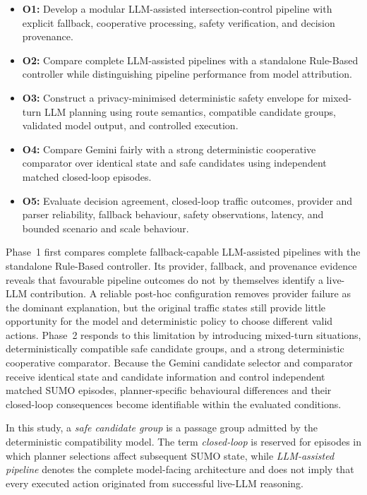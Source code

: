 \documentclass[letterpaper,10pt,conference]{ieeeconf}
\begin{document}
\begin{itemize}

    \item \textbf{O1:} Develop a modular LLM-assisted intersection-control pipeline with explicit fallback, cooperative processing, safety verification, and decision provenance.

    \item \textbf{O2:} Compare complete LLM-assisted pipelines with a standalone Rule-Based controller while distinguishing pipeline performance from model attribution.

    \item \textbf{O3:} Construct a privacy-minimised deterministic safety envelope for mixed-turn LLM planning using route semantics, compatible candidate groups, validated model output, and controlled execution.

    \item \textbf{O4:} Compare Gemini fairly with a strong deterministic cooperative comparator over identical state and safe candidates using independent matched closed-loop episodes.

    \item \textbf{O5:} Evaluate decision agreement, closed-loop traffic outcomes, provider and parser reliability, fallback behaviour, safety observations, latency, and bounded scenario and scale behaviour.

\end{itemize}



Phase~1 first compares complete fallback-capable LLM-assisted pipelines with the standalone Rule-Based controller. Its provider, fallback, and provenance evidence reveals that favourable pipeline outcomes do not by themselves identify a live-LLM contribution. A reliable post-hoc configuration removes provider failure as the dominant explanation, but the original traffic states still provide little opportunity for the model and deterministic policy to choose different valid actions. Phase~2 responds to this limitation by introducing mixed-turn situations, deterministically compatible safe candidate groups, and a strong deterministic cooperative comparator. Because the Gemini candidate selector and comparator receive identical state and candidate information and control independent matched SUMO episodes, planner-specific behavioural differences and their closed-loop consequences become identifiable within the evaluated conditions.

In this study, a \emph{safe candidate group} is a passage group admitted by the deterministic compatibility model. The term \emph{closed-loop} is reserved for episodes in which planner selections affect subsequent SUMO state, while \emph{LLM-assisted pipeline} denotes the complete model-facing architecture and does not imply that every executed action originated from successful live-LLM reasoning.
\end{document}
